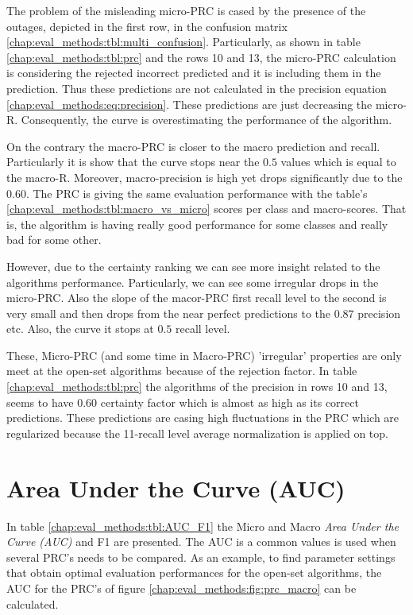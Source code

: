 The problem of the misleading micro-PRC is cased by the presence of the outages, depicted in the first row, in the confusion matrix \ref{chap:eval_methods:tbl:multi_confusion}. Particularly, as shown in table \ref{chap:eval_methods:tbl:prc} and the rows 10 and 13, the micro-PRC calculation is considering the rejected incorrect predicted and it is including them in the prediction. Thus these predictions are not calculated in the precision equation \ref{chap:eval_methods:eq:precision}. These predictions are just decreasing the micro-R. Consequently, the curve is overestimating the performance of the algorithm.

On the contrary the macro-PRC is closer to the macro prediction and recall. Particularly it is show that the curve stops near the $0.5$ values which is equal to the macro-R. Moreover, macro-precision is high yet drops significantly due to the $0.60$. The PRC is giving the same evaluation performance with the table's \ref{chap:eval_methods:tbl:macro_vs_micro} scores per class and macro-scores. That is, the algorithm is having really good performance for some classes and really bad for some other.

However, due to the certainty ranking we can see more insight related to the algorithms performance. Particularly, we can see some irregular drops in the micro-PRC. Also the slope of the macor-PRC first recall level to the second is very small and then drops from the near perfect predictions to the $0.87$ precision etc. Also, the curve it stops at $0.5$ recall level.

These, Micro-PRC (and some time in Macro-PRC) 'irregular' properties are only meet at the open-set algorithms because of the rejection factor. In table \ref{chap:eval_methods:tbl:prc} the algorithms of the precision in rows 10 and 13, seems to have $0.60$ certainty factor which is almost as high as its correct predictions. These predictions are casing high fluctuations in the PRC which are regularized because the 11-recall level average normalization is applied on top. 


\section{Area Under the Curve (AUC)}\label{chap:eval_methods:sec:closed_set_classification} 

In table \ref{chap:eval_methods:tbl:AUC_F1} the Micro and Macro \textit{Area Under the Curve (AUC)} and F1 are presented. The AUC is a common values is used when several PRC's needs to be compared. As an example, to find parameter settings that obtain optimal evaluation performances for the open-set algorithms, the AUC for the PRC's of figure \ref{chap:eval_methods:fig:prc_macro} can be calculated. 


